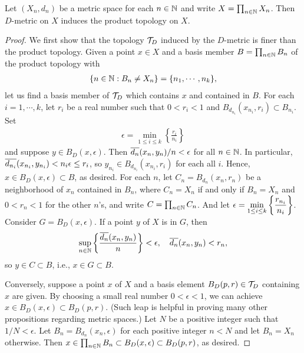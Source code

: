 \begin{thm}
    Let $(X_n, d_n)$ be a metric space for each $n\in{\mathbb{N}}$ and write $X=\prod_{n\in{\mathbb{N}}} X_n$.
    Then $D$-metric on $X$ induces the product topology on $X$.
\end{thm}
\begin{proof}
    We first show that the topology ${\mathcal{T}}_D$ induced by the $D$-metric is finer than the product topology.
    Given a point $x\in X$ and a basis member $B=\prod_{n\in{\mathbb{N}}}B_n$ of the product topology with
    \begin{align*}
        \displaystyle{\{n\in{\mathbb{N}}:B_n\neq X_n\}=\{n_1, \cdots, n_k\}},
    \end{align*}
    let us find a basis member of ${\mathcal{T}}_D$ which contains $x$ and contained in $B$.
    For each $i=1, \cdots, k$, let $r_i$ be a real number such that $0<r_i<1$ and $B_{d_{n_i}}(x_{n_i}, r_i)\subset B_{n_i}$.
    Set
    \begin{align*}
        \epsilon=\min_{1\leq i\leq k}\left\{\frac{r_i}{n_i}\right\}
    \end{align*}
    and suppose $y\in B_D(x, \epsilon)$.
    Then $\overline{d_n}(x_n, y_n)/n<\epsilon$ for all $n\in{\mathbb{N}}$.
    In particular, $\overline{d_{n_i}}(x_{n_i}, y_{n_i})<n_i\epsilon\leq r_i$, so $y_{n_i}\in B_{d_{n_i}}(x_{n_i}, r_i)$ for each all $i$.
    Hence, $x\in B_D(x, \epsilon)\subset B$, as desired.
    \ifinclude\else
    For each $n$, let $C_n=B_{d_n}(x_n, r_n)$ be a neighborhood of $x_n$ contained in $B_n$, where $C_n=X_n$ if and only if $B_n=X_n$ and $0<r_n<1$ for the other $n$'s, and write $C=\prod_{n\in{\mathbb{N}}}C_n$.
    And let $\displaystyle{\epsilon=\min_{1\leq i\leq k}\left\{\frac{r_{n_i}}{n_i}\right\}}$.
    Consider $G=B_D(x, \epsilon)$.
    If a point $y$ of $X$ is in $G$, then
    \begin{align*}
        \sup_{n\in{\mathbb{N}}}\left\{\frac{\overline{d_n}(x_n, y_n)}{n}\right\} < \epsilon,\quad\overline{d_n}(x_n, y_n) < r_n,
    \end{align*}
    so $y\in C\subset B$, i.e., $x\in G\subset B$.
    \fi
    
    Conversely, suppose a point $x$ of $X$ and a basis element $B_D(p, r)\in {\mathcal{T}}_D$ containing $x$ are given.
    By choosing a small real number $0<\epsilon<1$, we can achieve $x\in B_D(x, \epsilon)\subset B_D(p, r)$.
    \color{teal}(Such leap is helpful in proving many other propositions regarding metric spaces.) \color{black}
    Let $N$ be a positive integer such that $1/N < \epsilon$.
    Let $B_n=B_{d_n}(x_n, \epsilon)$ for each positive integer $n<N$ and let $B_n=X_n$ otherwise.
    Then $x\in\prod_{n\in{\mathbb{N}}}B_n\subset B_D(x, \epsilon)\subset B_D(p, r)$, as desired.
\end{proof}

